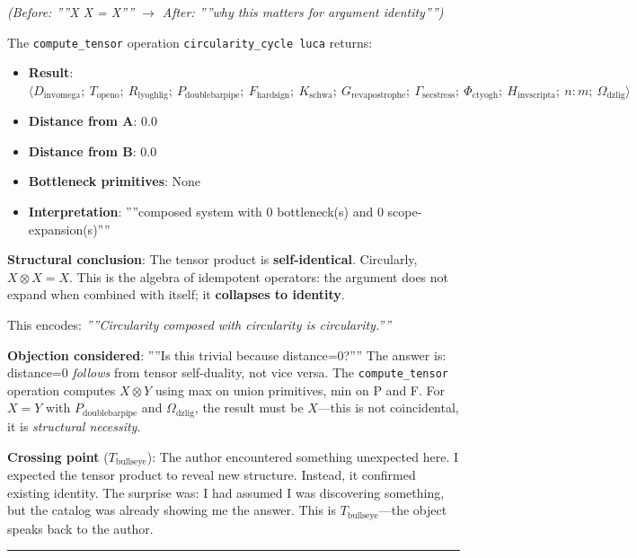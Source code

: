 \documentclass[12pt,a4paper]{article}
\begin{document}
\emph{(Before: ''''X \otimes X = X'''' $\rightarrow$ After: ''''why this matters for argument identity'''')}

The \texttt{compute\_tensor} operation \texttt{circularity\_cycle \otimes luca} returns:

\begin{itemize}
    \item \textbf{Result}: $\langle D_{\text{invomega}};\ T_{\text{openo}};\ R_{\text{lyoghlig}};\ P_{\text{doublebarpipe}};\ F_{\text{hardsign}};\ K_{\text{schwa}};\ G_{\text{revapostrophe}};\ \Gamma_{\text{secstress}};\ \Phi_{\text{ctyogh}};\ H_{\text{invscripta}};\ n{:}m;\ \Omega_{\text{dzlig}} \rangle$
    \item \textbf{Distance from A}: 0.0
    \item \textbf{Distance from B}: 0.0
    \item \textbf{Bottleneck primitives}: None
    \item \textbf{Interpretation}: ''''composed system with 0 bottleneck(s) and 0 scope-expansion(s)''''
\end{itemize}

\textbf{Structural conclusion}: The tensor product is \textbf{self-identical}. Circularly, $X \otimes X = X$. This is the algebra of idempotent operators: the argument does not expand when combined with itself; it \textbf{collapses to identity}.

This encodes: \emph{''''Circularity composed with circularity is circularity.''''}

\textbf{Objection considered}: ''''Is this trivial because distance=0?'''' The answer is: distance=0 \emph{follows} from tensor self-duality, not vice versa. The \texttt{compute\_tensor} operation computes $X \otimes Y$ using max on union primitives, min on P and F. For $X=Y$ with $P_{\text{doublebarpipe}}$ and $\Omega_{\text{dzlig}}$, the result must be $X$---this is not coincidental, it is \emph{structural necessity}.

\textbf{Crossing point} ($T_{\text{bullseye}}$): The author encountered something unexpected here. I expected the tensor product to reveal new structure. Instead, it confirmed existing identity. The surprise was: I had assumed I was discovering something, but the catalog was already showing me the answer. This is $T_{\text{bullseye}}$---the object speaks back to the author.

\begin{center}
\rule{0.5\textwidth}{0.4pt}
\end{center}
\end{document}
